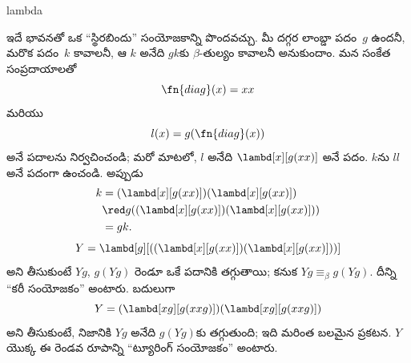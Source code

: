 \documentclass[../../../include/open-logic-section]{subfiles}
\begin{document}
\begin{tagblock}{lambda}
\begin{digress}
ఇదే భావనతో ఒక ``స్థిరబిందు'' సంయోజకాన్ని పొందవచ్చు. మీ దగ్గర లాంబ్డా
పదం~$g$ ఉందనీ, మరొక పదం~$k$ కావాలనీ, ఆ $k$ అనేది $gk$కు
$\beta$-తుల్యం కావాలనీ అనుకుందాం. మన సంకేత సంప్రదాయాలతో
\[
\fn{diag}(x)=xx
\]
మరియు
\[
l(x)=g(\fn{diag}(x))
\]
అనే పదాలను నిర్వచించండి; మరో మాటలో, $l$ అనేది
$\lambd[x][g(xx)]$ అనే పదం. $k$ను $ll$ అనే పదంగా ఉంచండి. అప్పుడు
\begin{align*}
k & = (\lambd[x][g(xx)])(\lambd[x][g(xx)]) \\
& \red g((\lambd[x][g(xx)])(\lambd[x][g(xx)])) \\
& = gk.
\end{align*}
\[
Y=\lambd[g][((\lambd[x][g(xx)])(\lambd[x][g(xx)]))]
\]
అని తీసుకుంటే $Yg$, $g(Yg)$ రెండూ ఒకే పదానికి తగ్గుతాయి; కనుక
$Yg\equiv_\beta g(Yg)$. దీన్ని ``కరీ సంయోజకం'' అంటారు. బదులుగా
\[
Y=(\lambd[xg][g(xxg)])(\lambd[xg][g(xxg)])
\]
అని తీసుకుంటే, నిజానికి $Yg$ అనేది $g(Yg)$కు తగ్గుతుంది; ఇది మరింత
బలమైన ప్రకటన. $Y$ యొక్క ఈ రెండవ రూపాన్ని ``ట్యూరింగ్ సంయోజకం'' అంటారు.
\end{digress}
\end{tagblock}
\end{document}

